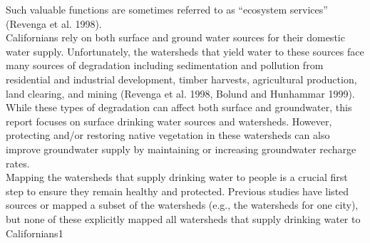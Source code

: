 \begin{itemize}
 Such valuable
functions are sometimes referred to as “ecosystem services” (Revenga et al. 1998).\\
Californians rely on both surface and ground water sources for their domestic water supply. Unfortunately, the watersheds that yield water to these sources face many sources of degradation including sedimentation and pollution from residential and industrial development, timber harvests, agricultural production, land clearing, and mining (Revenga et al. 1998, Bolund and Hunhammar 1999). While these types of degradation can affect both surface
and groundwater, this report focuses on surface drinking water sources and watersheds. However, protecting and/or restoring native vegetation in these watersheds can also improve groundwater supply by maintaining or increasing groundwater recharge rates.\\
Mapping the watersheds that supply drinking water to people is a crucial first step to ensure they remain healthy and protected. Previous studies have listed sources or mapped a subset of the watersheds (e.g., the watersheds for one city), but none of these explicitly mapped all 
watersheds that supply drinking water to Californians1
\end{itemize}
